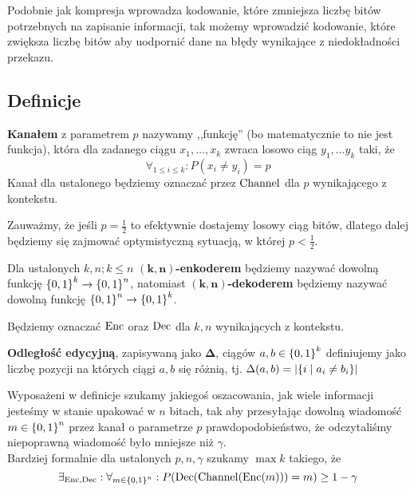 Podobnie jak kompresja wprowadza kodowanie, które zmniejsza liczbę bitów potrzebnych na zapisanie informacji, tak możemy wprowadzić kodowanie, które zwiększa liczbę bitów aby uodpornić dane na błędy wynikające z niedokładności przekazu.

\subsection{Definicje}

\begin{definition}
	\textbf{Kanałem} z parametrem \( p \) nazywamy ,,funkcję'' (bo matematycznie to nie jest funkcja), która dla zadanego ciągu \( x_1, \dots, x_k \) zwraca losowo ciąg \( y_1, \dots y_k \) taki, że
	\[
		\forall_{1 \leq i \leq k} : P(x_i \neq y_i) = p
	\]
	Kanał dla ustalonego będziemy oznaczać przez \( \operatorname{Channel} \) dla \( p \) wynikającego z kontekstu.
\end{definition}

Zauważmy, że jeśli \( p = \frac{1}{2} \) to efektywnie dostajemy losowy ciąg bitów,
dlatego dalej będziemy się zajmować optymistyczną sytuacją, w której \( p < \frac{1}{2} \).

\begin{definition}
	Dla ustalonych \( k, n ; k \leq n \) \(\mathbf{(k, n)}\)\textbf{-enkoderem} będziemy nazywać dowolną funkcję \( \set{0, 1}^k \rightarrow \set{0, 1}^n \), natomiast
	\(\mathbf{(k, n)}\)\textbf{-dekoderem} będziemy nazywać dowolną funkcję \( \set{0, 1}^n \rightarrow \set{0, 1}^k \).

	Będziemy oznaczać \( \operatorname{Enc} \) oraz \( \operatorname{Dec} \) dla \( k, n \) wynikających z kontekstu.
\end{definition}

\begin{definition}
	\textbf{Odległość edycyjną}, zapisywaną jako \( \mathbf{\Delta} \), ciągów \(a, b \in \set{0, 1}^k\) definiujemy jako liczbę pozycji na których ciągi \( a, b \) się różnią, tj. \( \Delta(a, b) = \card{\set{i \mid a_i \neq b_i}} \)
\end{definition}

Wyposażeni w definicje szukamy jakiegoś oszacowania, jak wiele informacji jesteśmy w stanie upakować w \( n \) bitach, tak aby przesyłając dowolną wiadomość \( m \in \set{0, 1}^n \) przez kanał o parametrze \( p \) prawdopodobieństwo, że odczytaliśmy niepoprawną wiadomość było mniejsze niż \( \gamma \). \\
Bardziej formalnie dla ustalonych \( p, n, \gamma \) szukamy \( \max k \) takiego, że
\[
	\exists_{\Enc, \Dec} : \forall_{m \in \set{0, 1}^n}: P\pars{\Dec(\Channel(\Enc(m))) = m} \geq 1 - \gamma
\]

